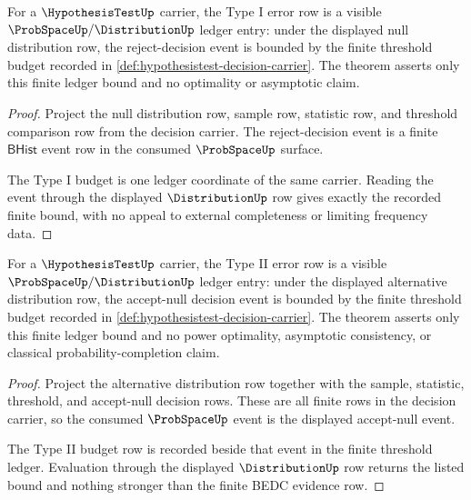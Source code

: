 \begin{theorem}
\label{thm:hypothesistest-type-one-error-ledger}
For a $\HypothesisTestUp$ carrier, the Type I error row is a visible
$\ProbSpaceUp/\DistributionUp$ ledger entry: under the displayed null
distribution row, the reject-decision event is bounded by the finite threshold
budget recorded in \autoref{def:hypothesistest-decision-carrier}. The theorem
asserts only this finite ledger bound and no optimality or asymptotic claim.
\end{theorem}
\begin{proof}
Project the null distribution row, sample row, statistic row, and threshold
comparison row from the decision carrier. The reject-decision event is a
finite $\mathsf{BHist}$ event row in the consumed $\ProbSpaceUp$ surface.

The Type I budget is one ledger coordinate of the same carrier. Reading the
event through the displayed $\DistributionUp$ row gives exactly the recorded
finite bound, with no appeal to external completeness or limiting frequency
data.
\end{proof}

\begin{theorem}
\label{thm:hypothesistest-type-two-error-ledger}
For a $\HypothesisTestUp$ carrier, the Type II error row is a visible
$\ProbSpaceUp/\DistributionUp$ ledger entry: under the displayed alternative
distribution row, the accept-null decision event is bounded by the finite
threshold budget recorded in
\autoref{def:hypothesistest-decision-carrier}. The theorem asserts only this
finite ledger bound and no power optimality, asymptotic consistency, or
classical probability-completion claim.
\end{theorem}
\begin{proof}
Project the alternative distribution row together with the sample, statistic,
threshold, and accept-null decision rows. These are all finite rows in the
decision carrier, so the consumed $\ProbSpaceUp$ event is the displayed
accept-null event.

The Type II budget row is recorded beside that event in the finite threshold
ledger. Evaluation through the displayed $\DistributionUp$ row returns the
listed bound and nothing stronger than the finite BEDC evidence row.
\end{proof}

